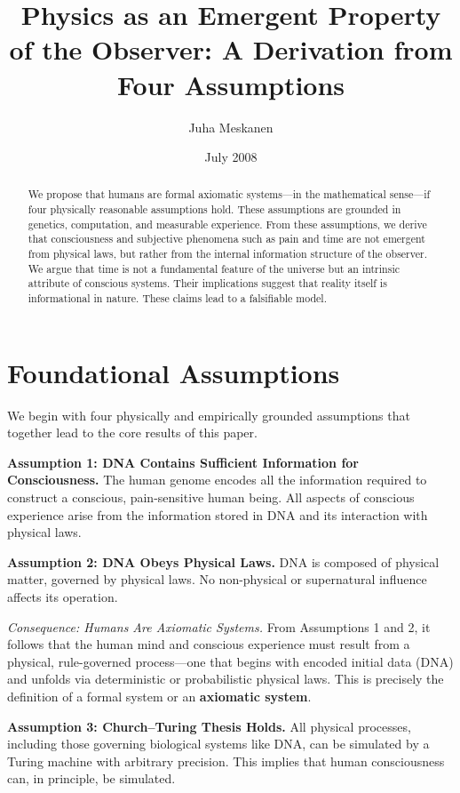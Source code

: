 \documentclass[11pt]{article}
\title{Physics as an Emergent Property of the Observer: A Derivation from Four Assumptions}
\author{Juha Meskanen}
\date{July 2008}
\begin{document}
\maketitle

\begin{abstract}
  We propose that humans are formal axiomatic systems—in the mathematical sense—if four physically
  reasonable assumptions hold. These assumptions are grounded in genetics, computation, and measurable
  experience. From these assumptions, we derive that consciousness and subjective phenomena such as pain
  and time are not emergent from physical laws, but rather from the internal information structure of the observer. We argue that time is not a fundamental feature of the universe but an intrinsic attribute of conscious systems. Their implications suggest that reality itself is informational in nature. These claims lead to a falsifiable model.
\end{abstract}

\section{Foundational Assumptions}

We begin with four physically and empirically grounded assumptions that together lead to the core results of this paper.

\textbf{Assumption 1: DNA Contains Sufficient Information for Consciousness.}
The human genome encodes all the information required to construct a conscious, pain-sensitive human being. All aspects of conscious experience arise from the information stored in DNA and its interaction with physical laws.

\textbf{Assumption 2: DNA Obeys Physical Laws.}
DNA is composed of physical matter, governed by physical laws. No non-physical or supernatural influence affects its operation.

\vspace{0.5em}
\textit{Consequence: Humans Are Axiomatic Systems.}
From Assumptions 1 and 2, it follows that the human mind and conscious experience must result from a physical, rule-governed process—one that begins with encoded initial data (DNA) and unfolds via deterministic or probabilistic physical laws. This is precisely the definition of a formal system or an \textbf{axiomatic system}.

\vspace{0.5em}
\textbf{Assumption 3: Church–Turing Thesis Holds.}
All physical processes, including those governing biological systems like DNA, can be simulated by a Turing machine with arbitrary precision. This implies that human consciousness can, in principle, be simulated.
\end{document}
